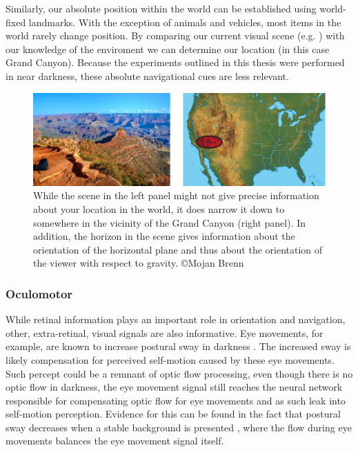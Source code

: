 Similarly, our absolute position within the world can be established using world-fixed landmarks. With the exception of animals and vehicles, most items in the world rarely change position. By comparing our current visual scene (e.g. ) with our knowledge of the enviroment we can determine our location (in this case Grand Canyon). Because the experiments outlined in this thesis were performed in near darkness, these absolute  navigational cues are less relevant.

\begin{figure}
    \includegraphics[width=1.0\textwidth]{src/intro/figures/Canyon.pdf}

    \caption{While the scene in the left panel might not give precise information about your location in the world, it does narrow it down to somewhere in the vicinity of the Grand Canyon (right panel). In addition, the horizon in the scene gives information about the orientation of the horizontal plane and thus about the orientation of the viewer with respect to gravity. \copyright Mojan Brenn}
    \label{intro:fig1}
\end{figure}


\subsubsection{Oculomotor}
While retinal information plays an important role in orientation and navigation, other, extra-retinal, visual signals are also informative. Eye movements, for example, are known to increase postural sway in darkness \cite{glasauer2005}. The increased sway is likely compensation for perceived self-motion caused by these eye movements. Such percept could be a remnant of optic flow processing, even though there is no optic flow in darkness, the eye movement signal still reaches the neural network responsible for compensating optic flow for eye movements and as such leak into self-motion perception. Evidence for this can be found in the fact that postural sway decreases when a stable background is presented \cite{glasauer2005,rodrigues2015}, where the  flow during eye movements balances the eye movement signal itself.


